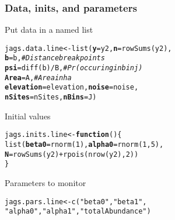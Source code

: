 \documentclass[color=usenames,dvipsnames]{beamer}\usepackage[]{graphicx}\usepackage[]{xcolor}
\makeatletter
\newcommand{\hlnum}[1]{\textcolor[rgb]{0.69,0.494,0}{#1}}%
\newcommand{\hlsng}[1]{\textcolor[rgb]{0.749,0.012,0.012}{#1}}%
\newcommand{\hlcom}[1]{\textcolor[rgb]{0.514,0.506,0.514}{\textit{#1}}}%
\newcommand{\hlopt}[1]{\textcolor[rgb]{0,0,0}{#1}}%
\newcommand{\hldef}[1]{\textcolor[rgb]{0,0,0}{#1}}%
\newcommand{\hlkwa}[1]{\textcolor[rgb]{0,0,0}{\textbf{#1}}}%
\newcommand{\hlkwb}[1]{\textcolor[rgb]{0,0.341,0.682}{#1}}%
\newcommand{\hlkwc}[1]{\textcolor[rgb]{0,0,0}{\textbf{#1}}}%
\newcommand{\hlkwd}[1]{\textcolor[rgb]{0.004,0.004,0.506}{#1}}%
\newenvironment{kframe}{%
 \def\at@end@of@kframe{}%
 \ifinner\ifhmode%
  \def\at@end@of@kframe{\end{minipage}}%
  \begin{minipage}{\columnwidth}%
 \fi\fi%
 \def\FrameCommand##1{\hskip\@totalleftmargin \hskip-\fboxsep
 \colorbox{shadecolor}{##1}\hskip-\fboxsep
     \hskip-\linewidth \hskip-\@totalleftmargin \hskip\columnwidth}%
 \MakeFramed {\advance\hsize-\width
   \@totalleftmargin\z@ \linewidth\hsize
   \@setminipage}}%
 {\par\unskip\endMakeFramed%
 \at@end@of@kframe}
\newenvironment{knitrout}{}{} %
\makeatother
\begin{document}
\begin{frame}[fragile]
  \frametitle{Data, inits, and parameters}
  Put data in a named list
  \vspace{-12pt}
\begin{knitrout}\footnotesize
{}\color{fgcolor}\begin{kframe}
\begin{alltt}
\hldef{jags.data.line} \hlkwb{<-} \hlkwd{list}\hldef{(}\hlkwc{y}\hldef{=y2,} \hlkwc{n}\hldef{=}\hlkwd{rowSums}\hldef{(y2),}
                       \hlkwc{b}\hldef{=b,}           \hlcom{# Distance break points}
                       \hlkwc{psi}\hldef{=}\hlkwd{diff}\hldef{(b)}\hlopt{/}\hldef{B,} \hlcom{# Pr(occuring in bin j)}
                       \hlkwc{Area}\hldef{=A,}        \hlcom{# Area in ha}
                       \hlkwc{elevation}\hldef{=elevation,} \hlkwc{noise}\hldef{=noise,}
                       \hlkwc{nSites}\hldef{=nSites,} \hlkwc{nBins}\hldef{=J)}
\end{alltt}
\end{kframe}
\end{knitrout}
\pause
\vfill
  Initial values
  \vspace{-12pt}
\begin{knitrout}\footnotesize
{}\color{fgcolor}\begin{kframe}
\begin{alltt}
\hldef{jags.inits.line} \hlkwb{<-} \hlkwa{function}\hldef{() \{}
    \hlkwd{list}\hldef{(}\hlkwc{beta0}\hldef{=}\hlkwd{rnorm}\hldef{(}\hlnum{1}\hldef{),} \hlkwc{alpha0}\hldef{=}\hlkwd{rnorm}\hldef{(}\hlnum{1}\hldef{,} \hlnum{5}\hldef{),}
         \hlkwc{N}\hldef{=}\hlkwd{rowSums}\hldef{(y2)}\hlopt{+}\hlkwd{rpois}\hldef{(}\hlkwd{nrow}\hldef{(y2),} \hlnum{2}\hldef{))}
\hldef{\}}
\end{alltt}
\end{kframe}
\end{knitrout}
\pause
\vfill
  Parameters to monitor
  \vspace{-12pt}
\begin{knitrout}\small
{}\color{fgcolor}\begin{kframe}
\begin{alltt}
\hldef{jags.pars.line} \hlkwb{<-} \hlkwd{c}\hldef{(}\hlsng{"beta0"}\hldef{,} \hlsng{"beta1"}\hldef{,}
                    \hlsng{"alpha0"}\hldef{,} \hlsng{"alpha1"}\hldef{,} \hlsng{"totalAbundance"}\hldef{)}
\end{alltt}
\end{kframe}
\end{knitrout}
\end{frame}
\end{document}
